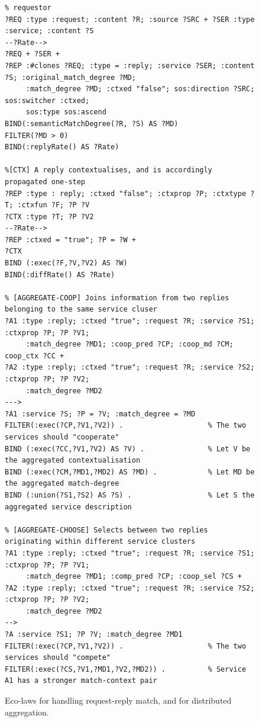 \documentclass[12pt,a4paper,twoside,openright]{book}
\begin{document}
\begin{figure}
{\scriptsize 
\begin{Verbatim}[frame=single, commandchars=\\\{\}, label={\small \bf Resource discovery with match-degree and spatial information}]
% [MATCH] When a request and service match, a reply LSA is generated to be diffused towards
% requestor
?REQ :type :request; :content ?R; :source ?SRC + ?SER :type :service; :content ?S
--?Rate-->
?REQ + ?SER +
?REP :#clones ?REQ; :type = :reply; :service ?SER; :content ?S; :original_match_degree ?MD;
     :match_degree ?MD; :ctxed "false"; sos:direction ?SRC; sos:switcher :ctxed;
     sos:type sos:ascend
BIND(:semanticMatchDegree(?R, ?S) AS ?MD)
FILTER(?MD > 0)
BIND(:replyRate() AS ?Rate)

%[CTX] A reply contextualises, and is accordingly propagated one-step
?REP :type : reply; :ctxed "false"; :ctxprop ?P; :ctxtype ?T; :ctxfun ?F; ?P ?V
?CTX :type ?T; ?P ?V2
--?Rate-->
?REP :ctxed = "true"; ?P = ?W +
?CTX
BIND (:exec(?F,?V,?V2) AS ?W)
BIND(:diffRate() AS ?Rate)

% [AGGREGATE-COOP] Joins information from two replies belonging to the same service cluser
?A1 :type :reply; :ctxed "true"; :request ?R; :service ?S1; :ctxprop ?P; ?P ?V1;
     :match_degree ?MD1; :coop_pred ?CP; :coop_md ?CM; coop_ctx ?CC +
?A2 :type :reply; :ctxed "true"; :request ?R; :service ?S2; :ctxprop ?P; ?P ?V2;
     :match_degree ?MD2
--->
?A1 :service ?S; ?P = ?V; :match_degree = ?MD
FILTER(:exec(?CP,?V1,?V2)) .                    % The two services should "cooperate"
BIND (:exec(?CC,?V1,?V2) AS ?V) .               % Let V be the aggregated contextualisation
BIND (:exec(?CM,?MD1,?MD2) AS ?MD) .            % Let MD be the aggregated match-degree
BIND (:union(?S1,?S2) AS ?S) .                  % Let S the aggregated service description

% [AGGREGATE-CHOOSE] Selects between two replies originating within different service clusters
?A1 :type :reply; :ctxed "true"; :request ?R; :service ?S1; :ctxprop ?P; ?P ?V1;
     :match_degree ?MD1; :comp_pred ?CP; :coop_sel ?CS +
?A2 :type :reply; :ctxed "true"; :request ?R; :service ?S2; :ctxprop ?P; ?P ?V2;
     :match_degree ?MD2
-->
?A :service ?S1; ?P ?V; :match_degree ?MD1
FILTER(:exec(?CP,?V1,?V2)) .                    % The two services should "compete"
FILTER(:exec(?CS,?V1,?MD1,?V2,?MD2)) .          % Service A1 has a stronger match-context pair
\end{Verbatim}
}
\caption{Eco-laws for handling request-reply match, and for distributed aggregation.}
\label{fig:laws}
\end{figure}
\end{document}
